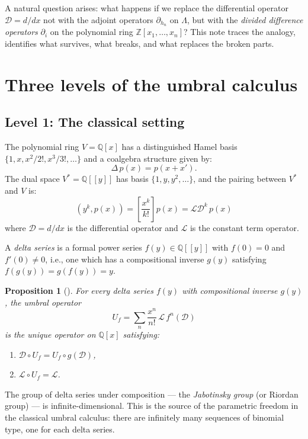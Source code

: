 \documentclass[11pt]{amsart}
\newtheorem{proposition}[theorem]{Proposition}
\theoremstyle{definition}
\newcommand{\Z}{\mathbb{Z}}
\newcommand{\Q}{\mathbb{Q}}
\newcommand{\cL}{\mathcal{L}}
\newcommand{\cD}{\mathcal{D}}
\begin{document}
A natural question arises: what happens if we replace the
differential operator $\cD = d/dx$ not with the adjoint operators
$\partial_{h_n}$ on $\Lambda$, but with the \emph{divided difference
operators} $\partial_i$ on the polynomial ring
$\Z[x_1,\dots,x_n]$? This note traces the analogy, identifies what
survives, what breaks, and what replaces the broken parts.

\section{Three levels of the umbral calculus}

\subsection{Level 1: The classical setting}\label{sec:classical}

The polynomial ring $V = \Q[x]$ has a distinguished Hamel basis
$\{1, x, x^2/2!, x^3/3!, \dots\}$ and a coalgebra structure given
by:
\[
  \Delta\, p(x) = p(x + x').
\]
The dual space $V^* = \Q[[y]]$ has basis $\{1, y, y^2, \dots\}$,
and the pairing between $V^*$ and $V$ is:
\[
  (y^k, p(x)) = \left[\frac{x^k}{k!}\right] p(x) = \cL \cD^k\, p(x)
\]
where $\cD = d/dx$ is the differential operator and $\cL$ is the
constant term operator.

A \emph{delta series} is a formal power series $f(y) \in \Q[[y]]$
with $f(0) = 0$ and $f'(0) \neq 0$, i.e., one which has a
compositional inverse $g(y)$ satisfying $f(g(y)) = g(f(y)) = y$.

\begin{proposition}[{\cite[Prop.~1.2]{Langer}}]
  For every delta series $f(y)$ with compositional inverse $g(y)$,
  the \emph{umbral operator}
  \[
    U_f = \sum_n \frac{x^n}{n!}\, \cL\, f^n(\cD)
  \]
  is the unique operator on $\Q[x]$ satisfying:
  \begin{enumerate}
    \item $\cD \circ U_f = U_f \circ g(\cD)$,
    \item $\cL \circ U_f = \cL$.
  \end{enumerate}
\end{proposition}

The group of delta series under composition --- the
\emph{Jabotinsky group} (or Riordan group) --- is
infinite-dimensional. This is the source of the parametric freedom
in the classical umbral calculus: there are infinitely many
sequences of binomial type, one for each delta series.
\end{document}
